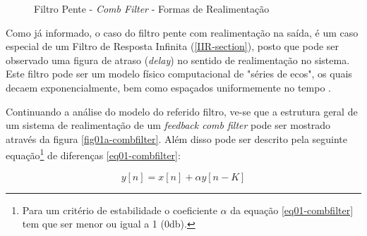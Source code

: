 		\begin{figure}[hbt]
			\centering
			\qquad
			\caption{Filtro Pente - \textit{Comb Filter} - Formas de Realimentação}
			\label{fig01-combfilter}
		\end{figure}
		
		Como já informado, o caso do filtro pente com realimentação na saída, é um caso especial de um Filtro de Resposta Infinita (\ref{IIR-section}), posto que pode ser observado uma figura de atraso (\textit{delay}) no sentido de realimentação no sistema. Este filtro pode ser um modelo físico computacional de "séries de ecos", os quais decaem exponencialmente, bem como espaçados uniformemente no tempo \cite{JuliusO.Smith2010}.
		
		
		Continuando a análise do modelo do referido filtro, ve-se que a estrutura geral de um sistema de realimentação de um \textit{ feedback comb filter} pode ser mostrado através da figura \ref{fig01a-combfilter}. Além disso pode ser descrito pela seguinte equação\footnote{Para um critério de estabilidade o coeficiente $\alpha$ da equação \ref{eq01-combfilter} tem que ser menor ou igual a 1 (0db).} de diferenças \ref{eq01-combfilter}:
				
		\begin{equation}
			\label{eq01-combfilter}
			y[n] = x[n] + \alpha y[n-K]
		\end{equation}
		
